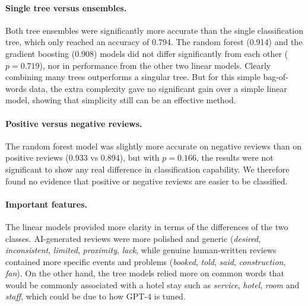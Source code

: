 \documentclass{article}
\begin{document}
\paragraph{Single tree versus ensembles.} 
Both tree ensembles were significantly more accurate than the single classification tree, which only reached an accuracy of 0.794. The random forest (0.914) and the gradient boosting (0.908) models did not differ significantly from each other ($p = 0.719$), nor in performance from the other two linear models. Clearly combining many trees outperforms a singular tree. But for this simple bag-of-words data, the extra complexity gave no significant gain over a simple linear model, showing that simplicity still can be an effective method.
 
\paragraph{Positive versus negative reviews.} 
The random forest model was slightly more accurate on negative reviews than on positive reviews (0.933 vs 0.894), but with $p = 0.166$, the results were not significant to show any real difference in classification capability. We therefore found no evidence that positive or negative reviews are easier to be classified. 


\paragraph{Important features.} 
The linear models provided more clarity in terms of the differences of the two classes. AI-generated reviews were more polished and generic (\emph{desired}, \emph{inconsistent}, \emph{limited}, \emph{proximity}, \emph{lack}, while genuine human-written reviews contained more specific events and problems (\emph{booked}, \emph{told}, \emph{said}, \emph{construction}, \emph{fan}). On the other hand, the tree models relied more on common words that would be commonly associated with a hotel stay such as \emph{service}, \emph{hotel}, \emph{room} and \emph{staff}, which could be due to how GPT-4 is tuned.
\end{document}
